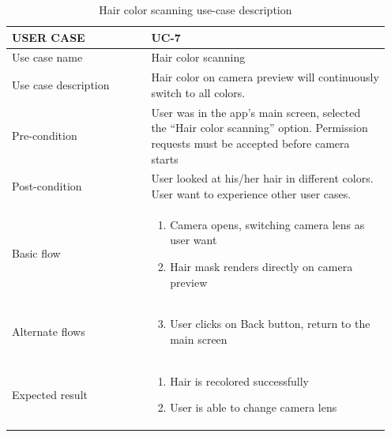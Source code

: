 \begin{center}
\begin{table} [H]
\caption{Hair color scanning use-case description} 
\begin{tabular}{p{0.35\linewidth} | p{0.6\linewidth}}
\hline
USER CASE            & UC-7 \\ \hline
Use case name        &  Hair color scanning  \\ \hline
Use case description &  Hair color on camera preview will continuously switch to all colors.    \\\hline
Pre-condition         &  User was in the app’s main screen, selected the “Hair color scanning” option. Permission requests must be accepted before camera starts    \\ \hline
Post-condition        &   User looked at his/her hair in different colors. User want to experience other user cases.   \\ \hline
Basic flow           &  \begin{enumerate}
    \item Camera opens, switching camera lens as user want
\item	Hair mask renders directly on camera preview

\end{enumerate}    \\ \hline
Alternate flows      &   \begin{enumerate}
    \setcounter{enumi}{2}
    \item User clicks on Back button, return to the main screen
\end{enumerate}   \\ \hline
Expected result      &  \begin{enumerate}
    \item Hair is recolored successfully
    \item User is able to change camera lens
\end{enumerate}    \\ \hline
\end{tabular}
\end{table}
\end{center}

